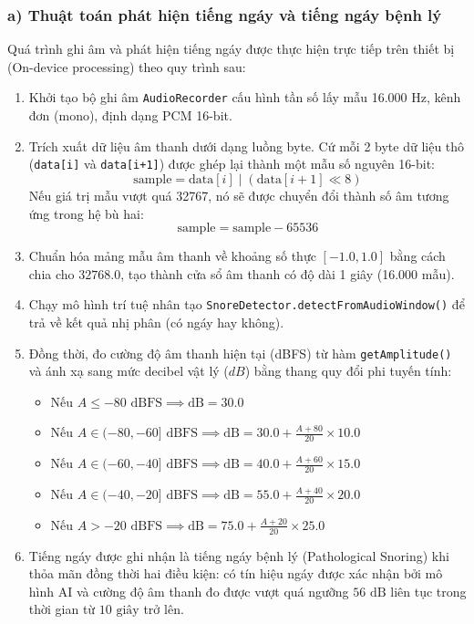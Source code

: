 \documentclass[12pt,a4paper]{article}
\begin{document}
\subsubsection*{a) Thuật toán phát hiện tiếng ngáy và tiếng ngáy bệnh lý}
Quá trình ghi âm và phát hiện tiếng ngáy được thực hiện trực tiếp trên thiết bị (On-device processing) theo quy trình sau:
\begin{enumerate}
    \item Khởi tạo bộ ghi âm \texttt{AudioRecorder} cấu hình tần số lấy mẫu 16.000 Hz, kênh đơn (mono), định dạng PCM 16-bit.
    \item Trích xuất dữ liệu âm thanh dưới dạng luồng byte. Cứ mỗi 2 byte dữ liệu thô (\texttt{data[i]} và \texttt{data[i+1]}) được ghép lại thành một mẫu số nguyên 16-bit:
    \begin{equation}
        \text{sample} = \text{data}[i] \mid (\text{data}[i+1] \ll 8)
    \end{equation}
    Nếu giá trị mẫu vượt quá 32767, nó sẽ được chuyển đổi thành số âm tương ứng trong hệ bù hai:
    \begin{equation}
        \text{sample} = \text{sample} - 65536
    \end{equation}
    \item Chuẩn hóa mảng mẫu âm thanh về khoảng số thực $[-1.0, 1.0]$ bằng cách chia cho $32768.0$, tạo thành cửa sổ âm thanh có độ dài 1 giây (16.000 mẫu).
    \item Chạy mô hình trí tuệ nhân tạo \texttt{SnoreDetector.detectFromAudioWindow()} để trả về kết quả nhị phân (có ngáy hay không).
    \item Đồng thời, đo cường độ âm thanh hiện tại (dBFS) từ hàm \texttt{getAmplitude()} và ánh xạ sang mức decibel vật lý ($dB$) bằng thang quy đổi phi tuyến tính:
    \begin{itemize}
        \item Nếu $A \le -80 \text{ dBFS} \implies \text{dB} = 30.0$
        \item Nếu $A \in (-80, -60] \text{ dBFS} \implies \text{dB} = 30.0 + \frac{A + 80}{20} \times 10.0$
        \item Nếu $A \in (-60, -40] \text{ dBFS} \implies \text{dB} = 40.0 + \frac{A + 60}{20} \times 15.0$
        \item Nếu $A \in (-40, -20] \text{ dBFS} \implies \text{dB} = 55.0 + \frac{A + 40}{20} \times 20.0$
        \item Nếu $A > -20 \text{ dBFS} \implies \text{dB} = 75.0 + \frac{A + 20}{20} \times 25.0$
    \end{itemize}
    \item Tiếng ngáy được ghi nhận là tiếng ngáy bệnh lý (Pathological Snoring) khi thỏa mãn đồng thời hai điều kiện: có tín hiệu ngáy được xác nhận bởi mô hình AI và cường độ âm thanh đo được vượt quá ngưỡng $56\text{ dB}$ liên tục trong thời gian từ $10\text{ giây}$ trở lên.
\end{enumerate}
\end{document}
